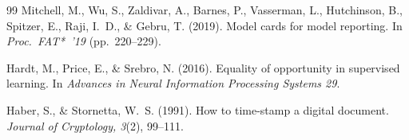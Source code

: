 \documentclass[11pt]{article}
\begin{document}
\begin{thebibliography}{99}
 Mitchell, M., Wu, S., Zaldivar, A., Barnes, P., Vasserman, L.,
Hutchinson, B., Spitzer, E., Raji, I.~D., \& Gebru, T. (2019). Model cards for model
reporting. In \emph{Proc.\ FAT*~'19} (pp.~220--229).

 Hardt, M., Price, E., \& Srebro, N. (2016). Equality of opportunity
in supervised learning. In \emph{Advances in Neural Information Processing Systems 29}.

 Haber, S., \& Stornetta, W.~S. (1991). How to time-stamp a digital
document. \emph{Journal of Cryptology, 3}(2), 99--111.

\end{thebibliography}
\end{document}
